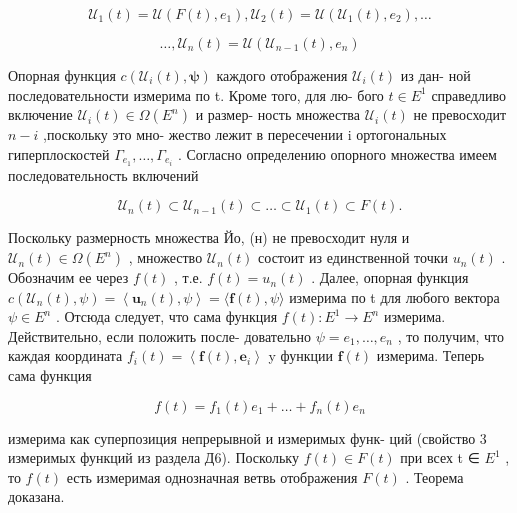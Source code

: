 \documentclass[8pt]{extarticle}
\begin{document}
\[
{\mathcal{U}}_{1}\left( t\right)  = \mathcal{U}\left( {F\left( t\right) ,{e}_{1}}\right) ,{\mathcal{U}}_{2}\left( t\right)  = \mathcal{U}\left( {{\mathcal{U}}_{1}\left( t\right) ,{e}_{2}}\right) ,\ldots
\]

\[
\ldots ,{\mathcal{U}}_{n}\left( t\right)  = \mathcal{U}\left( {{\mathcal{U}}_{n - 1}\left( t\right) ,{e}_{n}}\right)
\]

Опорная функция \(c\left( {{\mathcal{U}}_{i}\left( t\right) ,\mathbf{\psi }}\right)\) каждого отображения \({\mathcal{U}}_{i}\left( t\right)\) из дан- ной последовательности измерима по t. Кроме того, для лю- бого \(t \in  {E}^{1}\) справедливо включение \({\mathcal{U}}_{i}\left( t\right)  \in  \Omega \left( {E}^{n}\right)\) и размер- ность множества \({\mathcal{U}}_{i}\left( t\right)\) не превосходит \(n - i\) ,поскольку это мно- жество лежит в пересечении i ортогональных гиперплоскостей \({\Gamma }_{{e}_{1}},\ldots ,{\Gamma }_{{e}_{i}}\) . Согласно определению опорного множества имеем последовательность включений

\[
{\mathcal{U}}_{n}\left( t\right)  \subset  {\mathcal{U}}_{n - 1}\left( t\right)  \subset  \ldots  \subset  {\mathcal{U}}_{1}\left( t\right)  \subset  F\left( t\right) .
\]

Поскольку размерность множества Йо, (н) не превосходит нуля и \({\mathcal{U}}_{n}\left( t\right)  \in  \Omega \left( {E}^{n}\right)\) , множество \({\mathcal{U}}_{n}\left( t\right)\) состоит из единственной точки \({u}_{n}\left( t\right)\) . Обозначим ее через \(f\left( t\right)\) , т.е. \(f\left( t\right)  = {u}_{n}\left( t\right)\) . Далее, опорная функция \(c\left( {{\mathcal{U}}_{n}\left( t\right) ,\psi }\right)  = \left\langle  {{\mathbf{u}}_{n}\left( t\right) ,\psi }\right\rangle   = \langle \mathbf{f}\left( t\right) ,\psi \rangle\) измерима по t для любого вектора \(\psi  \in  {E}^{n}\) . Отсюда следует, что сама функция \(f\left( t\right)  : {E}^{1} \rightarrow  {E}^{n}\) измерима. Действительно, если положить после- довательно \(\psi  = {e}_{1},\ldots ,{e}_{n}\) , то получим, что каждая координата \({f}_{i}\left( t\right)  = \left\langle  {\mathbf{f}\left( t\right) ,{\mathbf{e}}_{i}}\right\rangle\) y функции \(\mathbf{f}\left( t\right)\) измерима. Теперь сама функция

\[
f\left( t\right)  = {f}_{1}\left( t\right) {e}_{1} + \ldots  + {f}_{n}\left( t\right) {e}_{n}
\]

измерима как суперпозиция непрерывной и измеримых функ- ций (свойство 3 измеримых функций из раздела Д6). Поскольку \(f\left( t\right)  \in  F\left( t\right)\) при всех t ∈ \({E}^{1}\) , то \(f\left( t\right)\) есть измеримая однозначная ветвь отображения \(F\left( t\right)\) . Теорема доказана.
\end{document}
